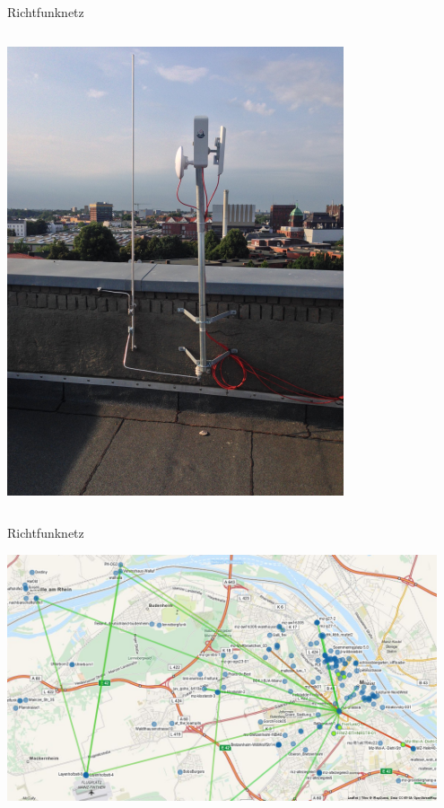 \documentclass[t]{beamer}
\begin{document}
\begin{frame}{Richtfunknetz}
\begin{columns}
\begin{column}{0.25\textwidth}
\begin{center}
          \includegraphics[width=\textwidth]{images/hamburg-richtfunkmast}
        \end{center}
      \end{column}
    \end{columns}
  \end{frame}

  \begin{frame}{Richtfunknetz}
    \begin{center}
      \includegraphics[width=0.95\textwidth]{images/2016-06-12_map-mainz-rifu}
    \end{center}
  \end{frame}
\end{document}
